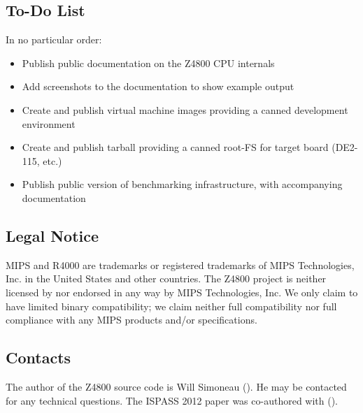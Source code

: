 \documentclass{article}
\newcommand{\rtm}{\latexhtml{\textregistered}{\begin{rawhtml}&reg;\end{rawhtml}}}
\begin{document}
\subsection{To-Do List}
In no particular order:
\begin{itemize}
\item Publish public documentation on the Z4800 CPU internals
\item Add screenshots to the documentation to show example output
\item Create and publish virtual machine images providing a canned development environment
\item Create and publish tarball providing a canned root-FS for target board (DE2-115, etc.)
\item Publish public version of benchmarking infrastructure, with accompanying documentation
\end{itemize}

\subsection{Legal Notice}
{
   \footnotesize
   MIPS and R4000 are trademarks or registered trademarks of MIPS Technologies,
   Inc. in the United States and other countries. The Z4800 project is neither
   licensed by nor endorsed in any way by MIPS Technologies, Inc. We only claim
   to have limited binary compatibility; we claim neither full compatibility
   nor full compliance with any MIPS\rtm{} products and/or specifications.
}

\subsection{Contacts}

The author of the Z4800 source code is Will Simoneau
(). He may
be contacted for any technical questions.
The ISPASS 2012 paper was co-authored with 
().



\end{document}

